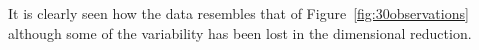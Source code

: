 It is clearly seen how the data resembles that of Figure~\ref{fig:30observations} although some of the variability has been lost in the dimensional reduction.

%
%
